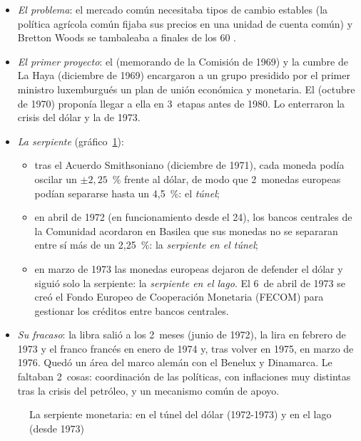 \documentclass[11pt]{article}
\begin{document}
\begin{itemize}
\item \emph{El problema}: el mercado común necesitaba tipos de cambio estables (la política agrícola común fijaba sus precios en una unidad de cuenta común) y Bretton Woods se tambaleaba a finales de los 60 .
\item \emph{El primer proyecto}: el  (memorando de la Comisión de 1969) y la cumbre de La Haya (diciembre de 1969) encargaron a un grupo presidido por el primer ministro luxemburgués  un plan de unión económica y monetaria. El  (octubre de 1970) proponía llegar a ella en 3~etapas antes de 1980\nocite{Werner1970Informe}. Lo enterraron la crisis del dólar y la de 1973.
\item \emph{La serpiente} (gráfico~\ref{fig:serpiente}):
  \begin{itemize}
  \item tras el Acuerdo Smithsoniano (diciembre de 1971), cada moneda podía oscilar un $\pm2{,}25$~\% frente al dólar, de modo que 2~monedas europeas podían separarse hasta un 4,5~\%: el \emph{túnel};
  \item en abril de 1972 (en funcionamiento desde el 24), los bancos centrales de la Comunidad acordaron en Basilea que sus monedas no se separaran entre sí más de un 2,25~\%: la \emph{serpiente en el túnel};
  \item en marzo de 1973 las monedas europeas dejaron de defender el dólar y siguió solo la serpiente: la \emph{serpiente en el lago}. El 6~de abril de 1973 se creó el Fondo Europeo de Cooperación Monetaria (FECOM) para gestionar los créditos entre bancos centrales.
  \end{itemize}
\item \emph{Su fracaso}: la libra salió a los 2~meses (junio de 1972), la lira en febrero de 1973 y el franco francés en enero de 1974 y, tras volver en 1975, en marzo de 1976\nocite{BPI1973Informe,BPI1976Informe}. Quedó un área del marco alemán con el Benelux y Dinamarca. Le faltaban 2~cosas: coordinación de las políticas, con inflaciones muy distintas tras la crisis del petróleo, y un mecanismo común de apoyo.
\end{itemize}

\begin{figure}[H]
\centering
\caption{La serpiente monetaria: en el túnel del dólar (1972-1973) y en el lago (desde 1973)}\label{fig:serpiente}
\end{figure}
\end{document}
